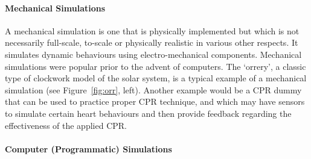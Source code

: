 \paragraph{Mechanical Simulations}

A mechanical simulation is one that is physically implemented but which is not necessarily full-scale, to-scale or physically realistic in various other respects. It simulates dynamic behaviours using electro-mechanical components. Mechanical simulations were popular prior to the advent of computers. The `orrery', a classic type of clockwork model of the solar system, is a typical example of a mechanical simulation (see Figure~\ref{fig:orr}, left). Another example would be a CPR dummy that can be used to practice proper CPR technique, and which may have sensors to simulate certain heart behaviours and then provide feedback regarding the effectiveness of the applied CPR.

\paragraph{Computer (Programmatic) Simulations}

